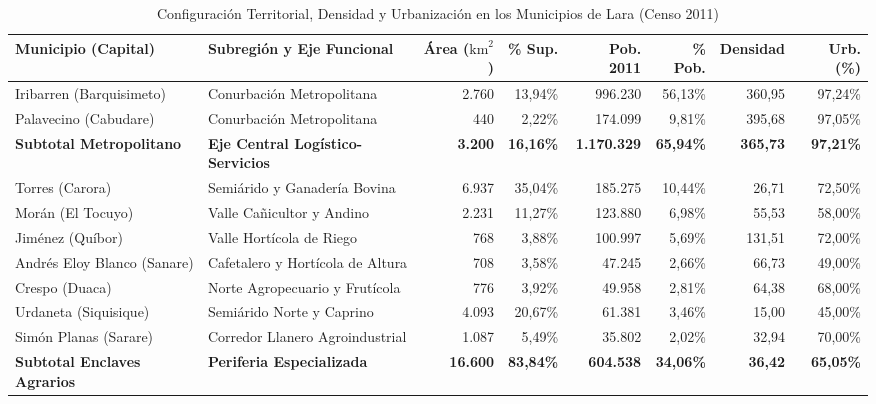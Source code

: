 \documentclass[12pt,letterpaper]{article}
\begin{document}
\begin{table}[htbp]
    \centering
    \caption{Configuración Territorial, Densidad y Urbanización en los Municipios de Lara (Censo 2011)}
    \label{tab:territorial}
    \scriptsize
    \setlength{\tabcolsep}{2.6pt}
    \begin{tabularx}{\textwidth}{>{\raggedright\arraybackslash}p{3.3cm}>{\raggedright\arraybackslash}Xrrrrrr}
        \toprule
        \textbf{Municipio (Capital)} & \textbf{Subregión y Eje Funcional} & \textbf{Área ($\text{km}^2$)} & \textbf{\% Sup.} & \textbf{Pob. 2011} & \textbf{\% Pob.} & \textbf{Densidad} & \textbf{Urb. (\%)} \\
        \midrule
        Iribarren (Barquisimeto) & Conurbación Metropolitana & 2.760 & 13,94\% & 996.230 & 56,13\% & 360,95 & 97,24\% \\
        Palavecino (Cabudare) & Conurbación Metropolitana & 440 & 2,22\% & 174.099 & 9,81\% & 395,68 & 97,05\% \\
        \midrule
        \textbf{Subtotal Metropolitano} & \textbf{Eje Central Logístico-Servicios} & \textbf{3.200} & \textbf{16,16\%} & \textbf{1.170.329} & \textbf{65,94\%} & \textbf{365,73} & \textbf{97,21\%} \\
        \midrule
        Torres (Carora) & Semiárido y Ganadería Bovina & 6.937 & 35,04\% & 185.275 & 10,44\% & 26,71 & 72,50\% \\
        Morán (El Tocuyo) & Valle Cañicultor y Andino & 2.231 & 11,27\% & 123.880 & 6,98\% & 55,53 & 58,00\% \\
        Jiménez (Quíbor) & Valle Hortícola de Riego & 768 & 3,88\% & 100.997 & 5,69\% & 131,51 & 72,00\% \\
        Andrés Eloy Blanco (Sanare) & Cafetalero y Hortícola de Altura & 708 & 3,58\% & 47.245 & 2,66\% & 66,73 & 49,00\% \\
        Crespo (Duaca) & Norte Agropecuario y Frutícola & 776 & 3,92\% & 49.958 & 2,81\% & 64,38 & 68,00\% \\
        Urdaneta (Siquisique) & Semiárido Norte y Caprino & 4.093 & 20,67\% & 61.381 & 3,46\% & 15,00 & 45,00\% \\
        Simón Planas (Sarare) & Corredor Llanero Agroindustrial & 1.087 & 5,49\% & 35.802 & 2,02\% & 32,94 & 70,00\% \\
        \midrule
        \textbf{Subtotal Enclaves Agrarios} & \textbf{Periferia Especializada} & \textbf{16.600} & \textbf{83,84\%} & \textbf{604.538} & \textbf{34,06\%} & \textbf{36,42} & \textbf{65,05\%} \\

\end{tabularx}
\end{table}
\end{document}
